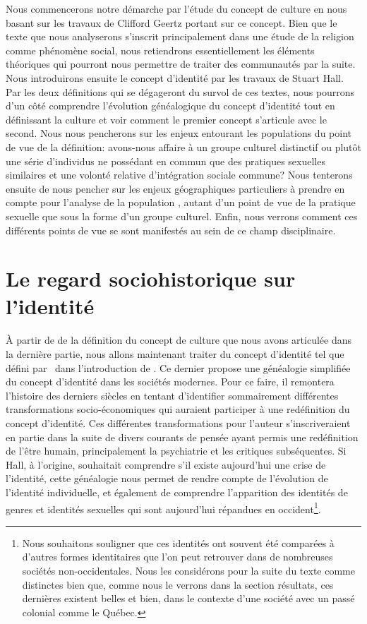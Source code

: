 Nous commencerons notre démarche par l'étude du concept de culture en nous basant sur les travaux de Clifford Geertz portant sur ce concept.
Bien que le texte que nous analyserons s'inscrit principalement dans une étude de la religion comme phénomène social, nous retiendrons essentiellement les éléments théoriques qui pourront nous permettre de traiter des communautés \lgbt{} par la suite.
Nous introduirons ensuite le concept d'identité par les travaux de Stuart Hall.
Par les deux définitions qui se dégageront du survol de ces textes, nous pourrons d'un côté comprendre l'évolution généalogique du concept d'identité tout en définissant la culture et voir comment le premier concept s'articule avec le second.
Nous nous pencherons sur les enjeux entourant les populations \lgbt{} du point de vue de la définition: avons-nous affaire à un groupe culturel distinctif ou plutôt une série d'individus ne possédant en commun que des pratiques sexuelles similaires et une volonté relative d'intégration sociale commune?
Nous tenterons ensuite de nous pencher sur les enjeux géographiques particuliers à prendre en compte pour l'analyse de la population \lgbt{}, autant d'un point de vue de la pratique sexuelle que sous la forme d'un groupe culturel.
Enfin, nous verrons comment ces différents points de vue se sont manifestés au sein de ce champ disciplinaire.

\section{Le regard sociohistorique sur l'identité}
\label{sec:le_regard_sociohistoirique_sur_l_identit_}

À partir de de la définition du concept de culture que nous avons articulée dans la dernière partie, nous allons maintenant traiter du concept d'identité tel que défini par~\citet{Hall1996a} dans l'introduction de .
Ce dernier propose une généalogie simplifiée du concept d'identité dans les sociétés modernes.
Pour ce faire, il remontera l'histoire des derniers siècles en tentant d'identifier sommairement différentes transformations socio-économiques qui auraient participer à une redéfinition du concept d'identité.
Ces différentes transformations pour l'auteur s'inscriveraient en partie dans la suite de divers courants de pensée ayant permis une redéfinition de l'être humain, principalement la psychiatrie et les critiques subséquentes.
Si Hall, à l'origine, souhaitait comprendre s'il existe aujourd'hui une crise de l'identité, cette généalogie nous permet de rendre compte de l'évolution de l'identité individuelle, et également de comprendre l'apparition des identités de genres et identités sexuelles qui sont aujourd'hui répandues en occident\footnote{Nous souhaitons souligner que ces identités ont souvent été comparées à d'autres formes identitaires que l'on peut retrouver dans de nombreuses sociétés non-occidentales.
  Nous les considérons pour la suite du texte comme distinctes bien que, comme nous le verrons dans la section résultats, ces dernières existent belles et bien, dans le contexte d'une société avec un passé colonial comme le Québec.}.

